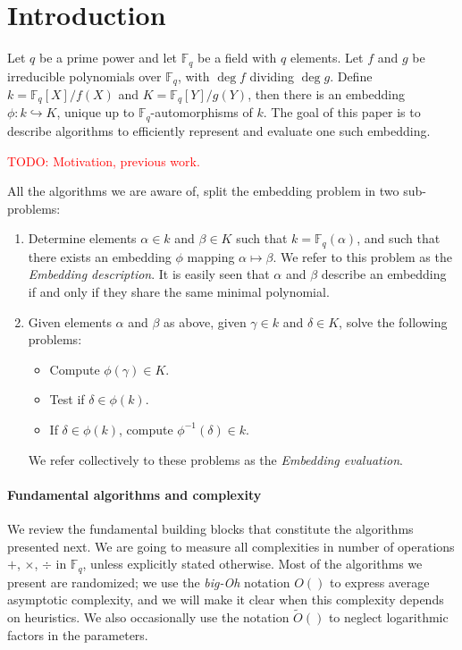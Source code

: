 \documentclass[12pt]{article}
\theoremstyle{plain}
\theoremstyle{definition}
\newcommand{\tildO}{\tilde{O}}
\newcommand{\todo}[1]{\textcolor{red}{TODO: #1}}
\def\F{\ensuremath{\mathbb{F}}}
\newcounter{algorithm}
\begin{document}
\section{Introduction}
\label{sec:introduction}

Let $q$ be a prime power and let $\F_q$ be a field with $q$
elements. Let $f$ and $g$ be irreducible polynomials over $\F_q$, with
$\deg f$ dividing $\deg g$. Define $k=\F_q[X]/f(X)$ and
$K=\F_q[Y]/g(Y)$, then there is an embedding $\phi:k\hookrightarrow
K$, unique up to $\F_q$-automorphisms of $k$. The goal of this paper
is to describe algorithms to efficiently represent and evaluate one
such embedding.

\todo{Motivation, previous work.}

All the algorithms we are aware of, split the embedding problem in two
sub-problems:
\begin{enumerate}
\item Determine elements $\alpha\in k$ and $\beta\in K$ such that
  $k=\F_q(\alpha)$, and such that there exists an
  embedding $\phi$ mapping $\alpha\mapsto\beta$. We refer to this
  problem as the \emph{Embedding description}.
  It is easily seen that $\alpha$ and $\beta$ describe an embedding
  if and only if they share the same minimal polynomial.
\item Given elements $\alpha$ and $\beta$ as above, given $\gamma\in
  k$ and $\delta\in K$, solve the following problems:
  \begin{itemize}
  \item Compute $\phi(\gamma)\in K$.
  \item Test if $\delta\in\phi(k)$.
  \item If $\delta\in\phi(k)$, compute $\phi^{-1}(\delta)\in k$.
  \end{itemize}
  We refer collectively to these problems as the \emph{Embedding
    evaluation}.
\end{enumerate}


\paragraph{Fundamental algorithms and complexity}
We review the fundamental building blocks that constitute the
algorithms presented next.  We are going to measure all complexities
in number of operations $+$, $\times$, $\div$ in $\F_q$, unless
explicitly stated otherwise. Most of the algorithms we present are
randomized; we use the \emph{big-Oh} notation $O()$ to express average
asymptotic complexity, and we will make it clear when this complexity
depends on heuristics. We also occasionally use the notation
$\tildO()$ to neglect logarithmic factors in the parameters.
\end{document}
